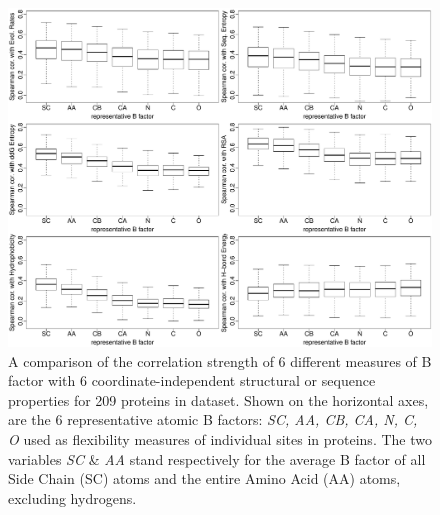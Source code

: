 \documentclass[11pt]{article}
\begin{document}
    \begin{figure}[tbh]
        \begin{center}
        \includegraphics[width=6.9in]{best_bf/select_variables/boxplot_bf_all_in_one.pdf}
        \end{center}
        \caption{A comparison of the correlation strength of 6 different measures of B factor with 6 coordinate-independent structural or sequence properties for 209 proteins in dataset. Shown on the horizontal axes, are the 6 representative atomic B factors: {\it SC, AA, CB, CA, N, C, O} used as flexibility measures of individual sites in proteins. The two variables {\it SC} \& {\it AA} stand respectively for the average B factor of all Side Chain (SC) atoms and the entire Amino Acid (AA) atoms, excluding hydrogens.}
        \label{fig:best_bf}
    \end{figure}
\end{document}
